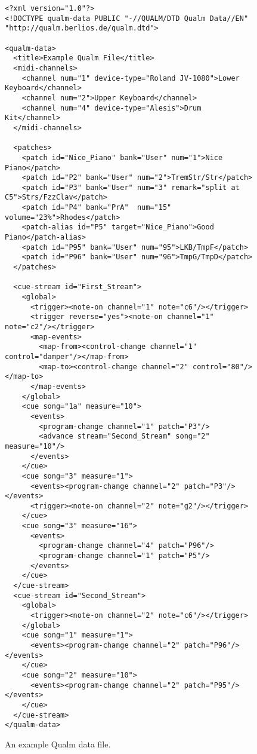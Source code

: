 \documentclass{article}
\newcommand{\q}{{\textsf{Qualm}}\xspace}
\begin{document}
\begin{figure}
\begin{scriptsize}
\begin{verbatim}
<?xml version="1.0"?>
<!DOCTYPE qualm-data PUBLIC "-//QUALM/DTD Qualm Data//EN" "http://qualm.berlios.de/qualm.dtd">

<qualm-data>
  <title>Example Qualm File</title>
  <midi-channels>
    <channel num="1" device-type="Roland JV-1080">Lower Keyboard</channel>
    <channel num="2">Upper Keyboard</channel>
    <channel num="4" device-type="Alesis">Drum Kit</channel>
  </midi-channels>

  <patches>
    <patch id="Nice_Piano" bank="User" num="1">Nice Piano</patch>
    <patch id="P2" bank="User" num="2">TremStr/Str</patch>
    <patch id="P3" bank="User" num="3" remark="split at C5">Strs/FzzClav</patch>
    <patch id="P4" bank="PrA"  num="15" volume="23%">Rhodes</patch>
    <patch-alias id="P5" target="Nice_Piano">Good Piano</patch-alias>
    <patch id="P95" bank="User" num="95">LKB/TmpF</patch>
    <patch id="P96" bank="User" num="96">TmpG/TmpD</patch>
  </patches>

  <cue-stream id="First_Stream">
    <global>
      <trigger><note-on channel="1" note="c6"/></trigger>
      <trigger reverse="yes"><note-on channel="1" note="c2"/></trigger>
      <map-events>
        <map-from><control-change channel="1" control="damper"/></map-from>
        <map-to><control-change channel="2" control="80"/></map-to>
      </map-events>
    </global>
    <cue song="1a" measure="10">
      <events>
        <program-change channel="1" patch="P3"/>
        <advance stream="Second_Stream" song="2" measure="10"/>
      </events>
    </cue>
    <cue song="3" measure="1">
      <events><program-change channel="2" patch="P3"/></events>
      <trigger><note-on channel="2" note="g2"/></trigger>
    </cue>
    <cue song="3" measure="16">
      <events>
        <program-change channel="4" patch="P96"/>
        <program-change channel="1" patch="P5"/>
      </events>
    </cue>
  </cue-stream>
  <cue-stream id="Second_Stream">
    <global>
      <trigger><note-on channel="2" note="c6"/></trigger>
    </global>
    <cue song="1" measure="1">
      <events><program-change channel="2" patch="P96"/></events>
    </cue>
    <cue song="2" measure="10">
      <events><program-change channel="2" patch="P95"/></events>
    </cue>
  </cue-stream>
</qualm-data>
\end{verbatim}
\end{scriptsize}
\caption{An example \q data file.\label{example-file}}
\end{figure}
\end{document}
